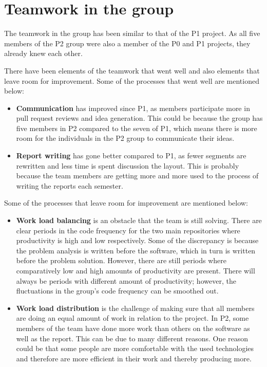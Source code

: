 \section{Teamwork in the group}\label{sec:teamwork-in-the-group}

The teamwork in the group has been similar to that of the P1 project.
As all five members of the P2 group were also a member of the P0 and P1 projects, they already knew each other.

There have been elements of the teamwork that went well and also elements that leave room for improvement.
Some of the processes that went well are mentioned below:

\begin{itemize}
    \item \textbf{Communication} has improved since P1, as members participate more in pull request reviews and idea
    generation.
    This could be because the group has five members in P2 compared to the seven of P1, which means there
    is more room for the individuals in the P2 group to communicate their ideas.
    \item \textbf{Report writing} has gone better compared to P1, as fewer segments are rewritten and less time is spent
    discussion the layout.
    This is probably because the team members are getting more and more used to the process of writing the reports each
    semester.
\end{itemize}

Some of the processes that leave room for improvement are mentioned below:

\begin{itemize}
    \item \textbf{Work load balancing} is an obstacle that the team is still solving.
    There are clear periods in the code frequency for the two main repositories where productivity is high and low
    respectively.
    Some of the discrepancy is because the problem analysis is written before the software, which in turn
    is written before the problem solution.
    However, there are still periods where comparatively low and high amounts of productivity are present.
    There will always be periods with different amount of productivity; however, the fluctuations in the group's code
    frequency can be smoothed out.
    \item \textbf{Work load distribution} is the challenge of making sure that all members are doing an equal amount
    of work in relation to the project.
    In P2, some members of the team have done more work than others on the software as well as the report.
    This can be due to many different reasons.
    One reason could be that some people are more comfortable with the used technologies and therefore are more
    efficient in their work and thereby producing more.
\end{itemize}

